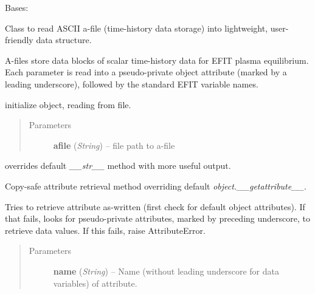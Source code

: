 \documentclass[letterpaper,10pt,english]{sphinxmanual}
\begin{document}
\begin{fulllineitems}
\label{eqtools:eqtools.afilereader.AFileReader}
Bases: 

Class to read ASCII a-file (time-history data storage) into lightweight,
user-friendly data structure.

A-files store data blocks of scalar time-history data for EFIT
plasma equilibrium.  Each parameter is read into a pseudo-private object
attribute (marked by a leading underscore), followed by the standard
EFIT variable names.

initialize object, reading from file.
\begin{quote}\begin{description}
\item[{Parameters}] \leavevmode
\textbf{afile} (\emph{String}) --
file path to a-file

\end{description}\end{quote}

\begin{fulllineitems}
\label{eqtools:eqtools.afilereader.AFileReader.__str__}
overrides default \emph{\_\_str\_\_} method with more useful output.

\end{fulllineitems}


\begin{fulllineitems}
\label{eqtools:eqtools.afilereader.AFileReader.__getattribute__}
Copy-safe attribute retrieval method overriding default
\emph{object.\_\_getattribute\_\_}.

Tries to retrieve attribute as-written (first check for default object
attributes).  If that fails, looks for pseudo-private attributes,
marked by preceding underscore, to retrieve data values.  If this
fails, raise AttributeError.
\begin{quote}\begin{description}
\item[{Parameters}] \leavevmode
\textbf{name} (\emph{String}) --
Name (without leading underscore for data variables)
of attribute.


\end{description}
\end{quote}
\end{fulllineitems}
\end{fulllineitems}
\end{document}
